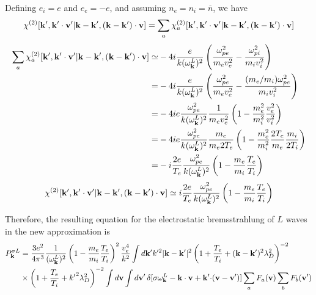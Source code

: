 \documentclass[12pt,a4paper,ruledheader]{report}
\def\bk{{\bf k}}
\begin{document}
\begin{appendix}
Defining $e_i=e$ and $e_e=-e$, and assuming $n_e=n_i=\overline{n}$, we have
\begin{equation}
\chi^{(2)}[{\bf k'},{\bf k'\cdot v'}|{\bf k-k'},({\bf k-k'})\cdot{\bf v}]
= \sum_a
\chi_a^{(2)}[{\bf k'},{\bf k'\cdot v'}|{\bf k-k'},({\bf k-k'})\cdot{\bf v}]
\end{equation}
\begin{equation}
\begin{split}
\sum_a
\chi_a^{(2)}[{\bf k'},{\bf k'\cdot v'}|{\bf k-k'},({\bf k-k'})\cdot{\bf v}]
\simeq & -4i\frac{e}{k(\omega_{\bf k}^L)^2}
\left(\frac{\omega_{pe}^2}{m_ev_e^2}-\frac{\omega_{pi}^2}{m_iv_i^2}\right)\\
=& -4i\frac{e}{k(\omega_{\bf k}^L)^2}
\left(\frac{\omega_{pe}^2}{m_ev_e^2}-\frac{(m_e/m_i)\omega_{pe}^2}{m_iv_i^2}\right)\\
=& -4ie\frac{\omega_{pe}^2}{k(\omega_{\bf k}^L)^2}\frac{1}{m_ev_e^2}
\left(1-\frac{m_e^2}{m_i^2}\frac{v_e^2}{v_i^2}\right)\\
=& -4ie\frac{\omega_{pe}^2}{k(\omega_{\bf k}^L)^2}\frac{m_e}{m_e2T_e}
\left(1-\frac{m_e^2}{m_i^2}\frac{2T_e}{m_e}\frac{m_i}{2T_i}\right)\\
=&-i\frac{2e}{T_e}\frac{\omega_{pe}^2}{k(\omega_{\bf k}^L)^2}
\left(1-\frac{m_e}{m_i}\frac{T_e}{T_i}\right)
\end{split}
\end{equation}
\begin{equation}
\label{chi2,4}
\chi^{(2)}[{\bf k'},{\bf k'\cdot v'}|{\bf k-k'},({\bf k-k'})\cdot{\bf v}]
\simeq i\frac{2e}{T_e}\frac{\omega_{pe}^2}{k(\omega_{\bf k}^L)^2}
\left(1-\frac{m_e}{m_i}\frac{T_e}{T_i}\right)
\end{equation}

Therefore, the resulting equation for the electrostatic bremsstrahlung
of $L$ waves in the new approximation is
\begin{equation}
  \label{PkL-A}
  \begin{split}
      P_{\bf k}^{\sigma L}
  &= \frac{3e^2}{4\pi^3}\frac{1}{(\omega_\bk^L)^2}
    \left(1-\frac{m_e}{m_i}\frac{T_e}{T_i}\right)^2\frac{v_e^4}{k^2}
    \int d{\bf k}'k'^2|{\bf k- k'}|^2\left(1+\frac{T_e}{T_i}
    +({\bf k}-{\bf k}')^2\lambda_D^2\right)^{-2}\\
  &\times\left(1+\frac{T_e}{T_i}
    +{k'}^2\lambda_D^2\right)^{-2} \int d{\bf v}\int d{\bf v}'\,
    \delta[\sigma \omega_{\bf k}^L-{\bf k \cdot v}
    +{\bf k'\cdot}({\bf v}-{\bf v}')]
    \sum_aF_a({\bf v})\sum_bF_b({\bf v}')
  \end{split}
\end{equation}


\end{appendix}
\end{document}
